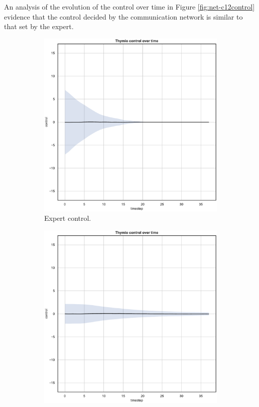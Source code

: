 An analysis of the evolution of the control over time in Figure 
\ref{fig:net-c12control} evidence that the control decided by the communication 
network is similar to that set by the expert.
\begin{figure}[!htb]
	\begin{center}
		\begin{subfigure}[h]{0.35\textwidth}
			\includegraphics[width=\textwidth]{contents/images/net-d12/control-overtime-omniscient}%
			\caption{Expert control.}
		\end{subfigure}
		\hspace{1cm}
		\begin{subfigure}[h]{0.35\textwidth}
			\includegraphics[width=\textwidth]{contents/images/net-d12/control-overtime-learned_distributed}

\end{subfigure}
\end{center}
\end{figure}
